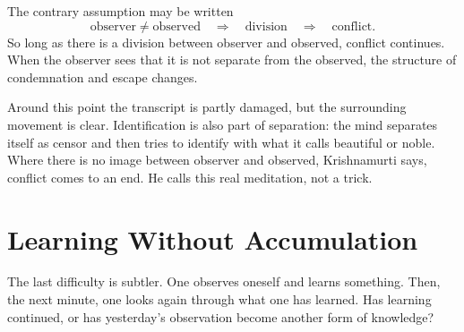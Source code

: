 The contrary assumption may be written
\begin{equation}
\text{observer} \neq \text{observed}
\quad\Longrightarrow\quad
\text{division}
\quad\Longrightarrow\quad
\text{conflict}.
\end{equation}
So long as there is a division between observer and observed, conflict continues. When the observer sees that it is not separate from the observed, the structure of condemnation and escape changes.

\begin{figure}
\centering
{}
\end{figure}

Around this point the transcript is partly damaged, but the surrounding movement is clear. Identification is also part of separation: the mind separates itself as censor and then tries to identify with what it calls beautiful or noble. Where there is no image between observer and observed, Krishnamurti says, conflict comes to an end. He calls this real meditation, not a trick.

\section{Learning Without Accumulation}

The last difficulty is subtler. One observes oneself and learns something. Then, the next minute, one looks again through what one has learned. Has learning continued, or has yesterday's observation become another form of knowledge?

